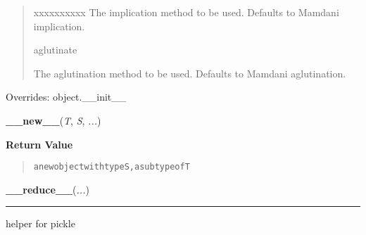 \begin{boxedminipage}{\textwidth}
\begin{quote}
\begin{Ventry}{xxxxxxxxxx}
The implication method to be used. Defaults to Mamdani implication.
          \item[aglutinate]


The aglutination method to be used. Defaults to Mamdani
aglutination.
        \end{Ventry}

      \end{quote}

    \vspace{1ex}

      Overrides: object.\_\_init\_\_

    \end{boxedminipage}

    \label{object:__new__}

    \vspace{0.5ex}

    \begin{boxedminipage}{\textwidth}

    \raggedright \textbf{\_\_new\_\_}(\textit{T}, \textit{S}, \textit{...})

      \textbf{Return Value}
      \begin{quote}
\begin{alltt}
a new object with type S, a subtype of T
\end{alltt}

      \end{quote}

    \vspace{1ex}

    \end{boxedminipage}

    \label{object:__reduce__}

    \vspace{0.5ex}

    \begin{boxedminipage}{\textwidth}

    \raggedright \textbf{\_\_reduce\_\_}(\textit{...})

    \vspace{-1.5ex}

    \rule{\textwidth}{0.5\fboxrule}

helper for pickle
    \vspace{1ex}

    \end{boxedminipage}

